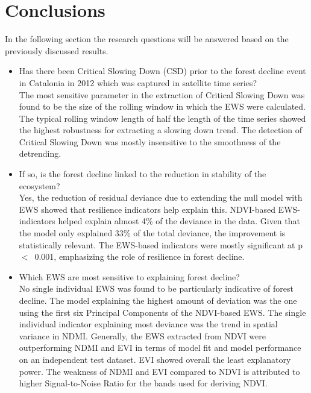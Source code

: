\section{Conclusions}\label{concl}
In the following section the research questions will be answered based on the previously discussed results.

\begin{itemize}
\item {Has there been Critical Slowing Down (CSD) prior to the forest decline event in Catalonia in 2012 which was captured in satellite time series?}\\
The most sensitive parameter in the extraction of Critical Slowing Down was found to be the size of the rolling window in which the EWS were calculated. The typical rolling window length of half the length of the time series showed the highest robustness for extracting a slowing down trend. The detection of Critical Slowing Down was mostly insensitive to the smoothness of the detrending. 

\item{If so, is the forest decline linked to the reduction in stability of the ecosystem?}\\
Yes, the reduction of residual deviance due to extending the null model with EWS showed that resilience indicators help explain this. NDVI-based EWS-indicators helped explain almost 4\% of the deviance in the data. Given that the model only explained 33\% of the total deviance, the improvement is statistically relevant. The EWS-based indicators were mostly significant at p~$<$~0.001, emphasizing the role of resilience in forest decline. 

\item{Which EWS are most sensitive to explaining forest decline?}\\
No single individual EWS was found to be particularly indicative of forest decline. The model explaining the highest amount of deviation was the one using the first six Principal Components of the NDVI-based EWS. The single individual indicator explaining most deviance was the trend in spatial variance in NDMI. Generally, the EWS extracted from NDVI were outperforming NDMI and EVI in terms of model fit and model performance on an independent test dataset. EVI showed overall the least explanatory power. The weakness of NDMI and EVI compared to NDVI is attributed to higher Signal-to-Noise Ratio for the bands used for deriving NDVI.
\end{itemize}
